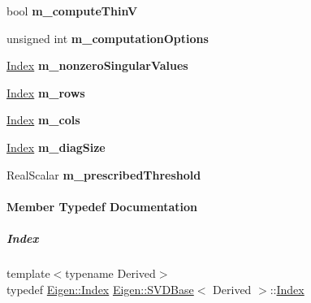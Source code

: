 \begin{DoxyCompactItemize}
bool {\bfseries m\+\_\+compute\+ThinV}
\item 
\mbox{\label{group___s_v_d___module_a680646d2f3fa0de030cbf9b4815d6cda}} 
unsigned int {\bfseries m\+\_\+computation\+Options}
\item 
\mbox{\label{group___s_v_d___module_aa41b395662650f2e10652f76365877c4}} 
\hyperlink{group___s_v_d___module_a6229a37997eca1072b52cca5ee7a2bec}{Index} {\bfseries m\+\_\+nonzero\+Singular\+Values}
\item 
\mbox{\label{group___s_v_d___module_a9c7ac2fc2666e3d34143c726a6462f1f}} 
\hyperlink{group___s_v_d___module_a6229a37997eca1072b52cca5ee7a2bec}{Index} {\bfseries m\+\_\+rows}
\item 
\mbox{\label{group___s_v_d___module_a65e1a36d7d3d90ad143fa6a6494695c9}} 
\hyperlink{group___s_v_d___module_a6229a37997eca1072b52cca5ee7a2bec}{Index} {\bfseries m\+\_\+cols}
\item 
\mbox{\label{group___s_v_d___module_a6eca3829eb56684ca01c291c6630c8d8}} 
\hyperlink{group___s_v_d___module_a6229a37997eca1072b52cca5ee7a2bec}{Index} {\bfseries m\+\_\+diag\+Size}
\item 
\mbox{\label{group___s_v_d___module_abbc1cfb200cc681ca18bdb1892597e62}} 
Real\+Scalar {\bfseries m\+\_\+prescribed\+Threshold}
\end{DoxyCompactItemize}


\paragraph{Member Typedef Documentation}
\mbox{\label{group___s_v_d___module_a6229a37997eca1072b52cca5ee7a2bec}} 
\subparagraph{\texorpdfstring{Index}{Index}\hspace{0.1cm}{\footnotesize\ttfamily [1/2]}}
{\footnotesize\ttfamily template$<$typename Derived$>$ \\
typedef \hyperlink{namespace_eigen_a62e77e0933482dafde8fe197d9a2cfde}{Eigen\+::\+Index} \hyperlink{group___s_v_d___module_class_eigen_1_1_s_v_d_base}{Eigen\+::\+S\+V\+D\+Base}$<$ Derived $>$\+::\hyperlink{group___s_v_d___module_a6229a37997eca1072b52cca5ee7a2bec}{Index}}

